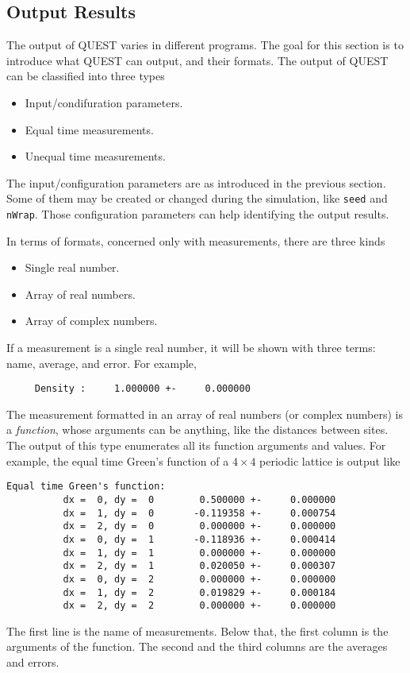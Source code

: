 \documentclass[12pt]{article}
\begin{document}
\subsection{Output Results}\label{sec output}
The output of QUEST varies in different programs. The goal for this section is to introduce what QUEST can output, and their formats. The output of QUEST can be classified into three types
\begin{itemize}
 \item Input/condifuration parameters.
 \item Equal time measurements.
 \item Unequal time measurements.
\end{itemize}

The input/configuration parameters are as introduced in the previous section. Some of them may be created or changed during the simulation, like \verb"seed" and \verb"nWrap". Those configuration parameters can help identifying the output results.

In terms of formats, concerned only with measurements, there are three kinds
\begin{itemize}
 \item Single real number.
 \item Array of real numbers.
 \item Array of complex numbers.
\end{itemize}

If a measurement is a single real number, it will be shown with three terms: name, average, and error. For example,
\begin{verbatim}
     Density :     1.000000 +-     0.000000
\end{verbatim}

The measurement formatted in an array of real numbers (or complex numbers) is a \emph{function}, whose arguments can be anything, like the distances between sites.
The output of this type enumerates all its function arguments and values. For example, the equal time Green's function of a $4\times 4$ periodic lattice is output like
\begin{verbatim}
Equal time Green's function:
          dx =  0, dy =  0        0.500000 +-     0.000000
          dx =  1, dy =  0       -0.119358 +-     0.000754
          dx =  2, dy =  0        0.000000 +-     0.000000
          dx =  0, dy =  1       -0.118936 +-     0.000414
          dx =  1, dy =  1        0.000000 +-     0.000000
          dx =  2, dy =  1        0.020050 +-     0.000307
          dx =  0, dy =  2        0.000000 +-     0.000000
          dx =  1, dy =  2        0.019829 +-     0.000184
          dx =  2, dy =  2        0.000000 +-     0.000000
\end{verbatim}
The first line is the name of measurements. Below that,
the first column is the arguments of the function. The second and the third columns are the averages and errors.
\end{document}
